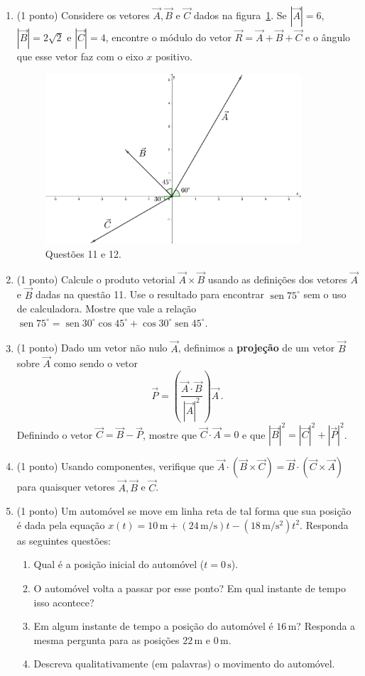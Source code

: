 \documentclass[12pt,a4paper]{article}
\newcommand{\dpar}[1]{\left(#1\right)}
\newcommand{\un}[1]{\mathrm{#1}}
\DeclareMathOperator{\sen}{sen}
\begin{document}
\begin{enumerate}
	\item (1 ponto) Considere os vetores $\vec A, \vec B$ e $\vec C$ dados na figura~\ref{fig}. Se $|\vec A|=6$, $|\vec B|=2\sqrt{2}$ e $|\vec C|=4$, encontre o módulo do vetor $\vec R=\vec A+\vec B+\vec C$ e o ângulo que esse vetor faz com o eixo $x$ positivo.
	\begin{figure}
		\centering
		\includegraphics[width=0.9\textwidth,keepaspectratio]{questao11}
		\caption{Questões 11 e 12.}
		\label{fig}
	\end{figure}
	\item (1 ponto) Calcule o produto vetorial $\vec A\times\vec B$ usando as definições dos vetores $\vec A$ e $\vec B$ dadas na questão 11. Use o resultado para encontrar $\sen 75^\circ$ sem o uso de calculadora. Mostre que vale a relação $\sen 75^\circ=\sen 30^\circ\cos 45^\circ+\cos 30^\circ\sen 45^\circ$.
	\item (1 ponto) Dado um vetor não nulo $\vec A$, definimos a \textbf{projeção} de um vetor $\vec B$ sobre $\vec A$ como sendo o vetor
	$$\vec P=\dpar{\frac{\vec A\cdot \vec B}{|\vec A|^2}}\vec A\,.$$
	Definindo o vetor $\vec C=\vec B-\vec P$, mostre que $\vec C\cdot\vec A=0$ e que $|\vec B|^2=|\vec C|^2+|\vec P|^2$.
	\item (1 ponto) Usando componentes, verifique que $\vec A\cdot(\vec B\times\vec C)=\vec B\cdot(\vec C\times \vec A)$ para quaisquer vetores $\vec A, \vec B$ e $\vec C$.
	\item (1 ponto) Um automóvel se move em linha reta de tal forma que sua posição é dada pela equação $x(t)=10\,\un{m}+(24\,\un{m}/\un{s})t-(18\,\un{m}/\un{s^2})t^2$. Responda as seguintes questões:
	\begin{enumerate}
		\item Qual é a posição inicial do automóvel ($t=0\,\un{s}$).
		\item O automóvel volta a passar por esse ponto? Em qual instante de tempo isso acontece?
		\item Em algum instante de tempo a posição do automóvel é $16\,\un{m}$? Res\-pon\-da a mesma pergunta para as posições $22\,\un{m}$ e $0\,\un{m}$.
		\item Descreva qualitativamente (em palavras) o movimento do automóvel.
	\end{enumerate}
\end{enumerate}
\end{document}
